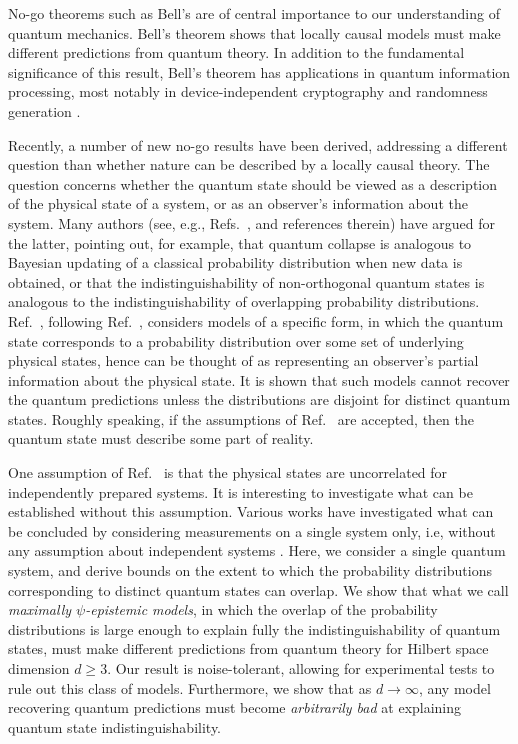 
No-go theorems such as Bell's \cite{Bell1964} are of central importance to our understanding of quantum mechanics. Bell's theorem shows that locally causal models must make different predictions from quantum theory. In addition to the fundamental significance of this result, Bell's theorem has applications in quantum information processing, most notably in device-independent cryptography and randomness generation \cite{Ekert1991, Barrett2005, Cavalcanti2012, Pironio2010}. 

Recently, a number of new no-go results have been derived, addressing a different question than whether nature can be described by a locally causal theory.  The question concerns whether the quantum state should be viewed as a description of the physical state of a system, or as an observer's information about the system. Many authors (see, e.g., Refs.~\cite{Spekkens2005, Bartlett2011, Fuchs2013}, and references therein) have argued for the latter, pointing out, for example, that quantum collapse is analogous to Bayesian updating of a classical probability distribution when new data is obtained, or that the indistinguishability of non-orthogonal quantum states is analogous to the indistinguishability of overlapping probability distributions. Ref.~\cite{Pusey2012}, following Ref.~\cite{Harrigan2010}, considers models of a specific form, in which the quantum state corresponds to a probability distribution over some set of underlying physical states, hence can be thought of as representing an observer's partial information about the physical state. It is shown that such models cannot recover the quantum predictions unless the distributions are disjoint for distinct quantum states. Roughly speaking, if the assumptions of Ref.~\cite{Pusey2012} are accepted, then the quantum state must describe some part of reality.

One assumption of Ref.~\cite{Pusey2012} is that the physical states are uncorrelated for independently prepared systems. It is interesting to investigate what can be established without this assumption. Various works have investigated what can be concluded by considering measurements on a single system only, i.e, without any assumption about independent systems \cite{Lewis2012,Maroney2012a,Leifer2013, Patra2013, Aaronson2013}. Here, we consider a single quantum system, and derive bounds on the extent to which the probability distributions corresponding to distinct quantum states can overlap. We show that what we call \emph{maximally $\psi$-epistemic models}, in which the overlap of the probability distributions is large enough to explain fully the indistinguishability of quantum states, must make different predictions from quantum theory for Hilbert space dimension $d\geq 3$. Our result is noise-tolerant, allowing for experimental tests to rule out this class of models. Furthermore, we show that as $d\rightarrow\infty$, any model recovering quantum predictions must become \emph{arbitrarily bad} at explaining quantum state indistinguishability. 



